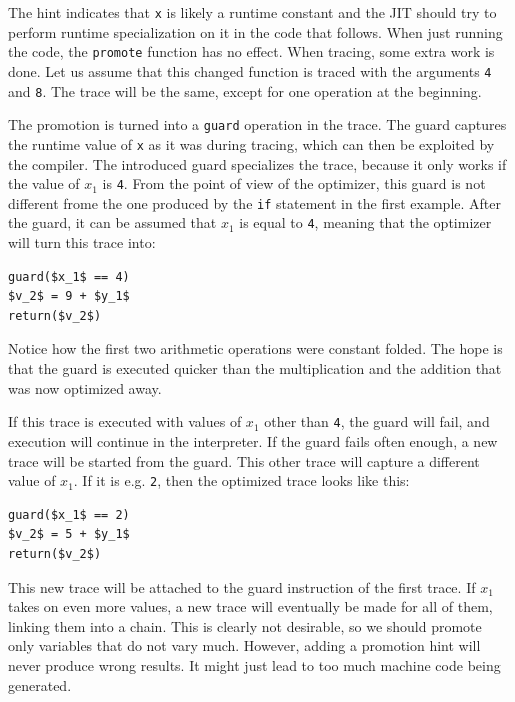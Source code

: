 \documentclass{sigplanconf}
\newcommand{\noop}{}
\begin{document}
The hint indicates that \texttt{x} is likely a runtime constant and the JIT
should try to perform runtime specialization on it
in the code that follows. When just running
the code, the \texttt{promote} function has no
effect. When tracing, some extra work
is done. Let us assume that this changed function is traced with
the arguments \texttt{4} and \texttt{8}. The trace will be the same, except for one
operation at the beginning.

The promotion is turned into a \texttt{guard} operation in the trace. The guard
captures the runtime value of \texttt{x} as it was during tracing, which can
then be exploited by the compiler. The introduced
guard specializes the trace, because it only works if the value of $x_1$ is
\texttt{4}. From the point of view of the
optimizer, this guard is not different frome the one produced by the \texttt{if}
statement in the first example. After the guard, it can be assumed that $x_1$
is equal to \texttt{4}, meaning that the optimizer will turn this trace into:

{\noop
\begin{lstlisting}[mathescape,basicstyle=\ttfamily]
guard($x_1$ == 4)
$v_2$ = 9 + $y_1$
return($v_2$)
\end{lstlisting}
}

Notice how the first two arithmetic operations were constant folded. The hope is
that the guard is executed quicker than the multiplication and the addition that
was now optimized away.

If this trace is executed with values of $x_1$ other than \texttt{4}, the guard will
fail, and execution will continue in the interpreter. If the guard fails often
enough, a new trace will be started from the guard. This other trace will
capture a different value of $x_1$. If it is e.g. \texttt{2}, then the optimized
trace looks like this:

{\noop
\begin{lstlisting}[mathescape,basicstyle=\ttfamily]
guard($x_1$ == 2)
$v_2$ = 5 + $y_1$
return($v_2$)
\end{lstlisting}
}

This new trace will be attached to the guard instruction of the first trace. If
$x_1$ takes on even more values, a new trace will eventually be made for all of them,
linking them into a chain. This is clearly not desirable, so we should promote
only variables that do not vary much. However, adding a promotion hint will never produce wrong
results. It might just lead to too much machine code being generated.
\end{document}

